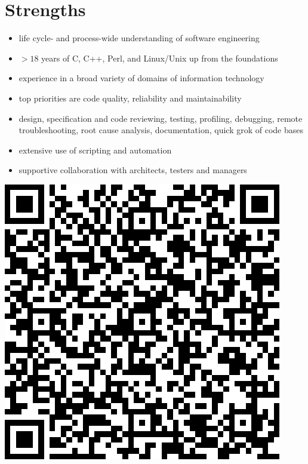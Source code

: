 \documentclass[a4paper,12pt]{article}
\newcommand{\compress}{\setlength\itemsep{-\parskip}}
\newenvironment{compressedItemize}{\begin{itemize}\compress}{\end{itemize}}
\begin{document}
\section{Strengths}

\begin{minipage}[b]{0.79\textwidth}
\begin{compressedItemize}
\item	life cycle- and process-wide understanding of software engineering
\item	$>18$ years of C, C++, Perl, and Linux/Unix up from the foundations
\item	experience in a broad variety of domains of information technology
\item	top priorities are code quality, reliability and maintainability
\item	design, specification and code reviewing, testing, profiling,
	debugging, remote \\ troubleshooting, root cause analysis,
	documentation,
	quick grok of code bases
\item	extensive use of scripting and automation
\item	supportive collaboration with architects, testers and managers
\end{compressedItemize}
\end{minipage}
\parbox[t]{0.20\textwidth}{\includegraphics[scale=0.32,clip=false]{qrcode}}
\end{document}
